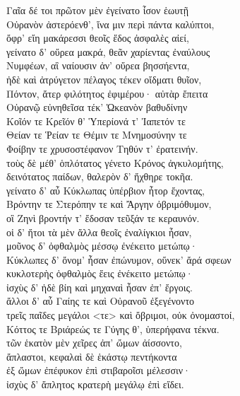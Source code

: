 \begin{pages}
\begin{Leftside}
Γαῖα δέ τοι πρῶτον μὲν ἐγείνατο ἶσον ἑωυτῇ\\
Οὐρανὸν ἀστερόενθ', ἵνα μιν περὶ πάντα καλύπτοι,\\
ὄφρ' εἴη μακάρεσσι θεοῖς ἕδος ἀσφαλὲς αἰεί,\\
γείνατο δ' οὔρεα μακρά, θεᾶν χαρίεντας ἐναύλους \\
Νυμφέων, αἳ ναίουσιν ἀν' οὔρεα βησσήεντα,  \\
ἠδὲ καὶ ἀτρύγετον πέλαγος τέκεν οἴδματι θυῖον,\\
Πόντον, ἄτερ φιλότητος ἐφιμέρου· αὐτὰρ ἔπειτα\\
Οὐρανῷ εὐνηθεῖσα τέκ' Ὠκεανὸν βαθυδίνην \\
Κοῖόν τε Κρεῖόν θ' Ὑπερίονά τ' Ἰαπετόν τε\\
Θείαν τε Ῥείαν τε Θέμιν τε Μνημοσύνην τε \\
Φοίβην τε χρυσοστέφανον Τηθύν τ' ἐρατεινήν.\\
τοὺς δὲ μέθ' ὁπλότατος γένετο Κρόνος ἀγκυλομήτης,\\
δεινότατος παίδων, θαλερὸν δ' ἤχθηρε τοκῆα. \\

\quad{}γείνατο δ' αὖ Κύκλωπας ὑπέρβιον ἦτορ ἔχοντας,\\
Βρόντην τε Στερόπην τε καὶ Ἄργην ὀβριμόθυμον, \\
οἳ Ζηνὶ βροντήν τ' ἔδοσαν τεῦξάν τε κεραυνόν.\\
οἱ δ' ἤτοι τὰ μὲν ἄλλα θεοῖς ἐναλίγκιοι ἦσαν,\\
μοῦνος δ' ὀφθαλμὸς μέσσῳ ἐνέκειτο μετώπῳ· \\
Κύκλωπες δ' ὄνομ' ἦσαν ἐπώνυμον, οὕνεκ' ἄρά σφεων\\
κυκλοτερὴς ὀφθαλμὸς ἕεις ἐνέκειτο μετώπῳ· \\
ἰσχὺς δ' ἠδὲ βίη καὶ μηχαναὶ ἦσαν ἐπ' ἔργοις.\\

\quad{}ἄλλοι δ' αὖ Γαίης τε καὶ Οὐρανοῦ ἐξεγένοντο\\
τρεῖς παῖδες μεγάλοι \textless{}τε\textgreater{} καὶ ὄβριμοι, οὐκ ὀνομαστοί, \\
Κόττος τε Βριάρεώς τε Γύγης θ', ὑπερήφανα τέκνα. \\
τῶν ἑκατὸν μὲν χεῖρες ἀπ' ὤμων ἀίσσοντο, \\
ἄπλαστοι, κεφαλαὶ δὲ ἑκάστῳ πεντήκοντα\\
ἐξ ὤμων ἐπέφυκον ἐπὶ στιβαροῖσι μέλεσσιν· \\
ἰσχὺς δ' ἄπλητος κρατερὴ μεγάλῳ ἐπὶ εἴδει.\\


\end{Leftside}
\end{pages}
